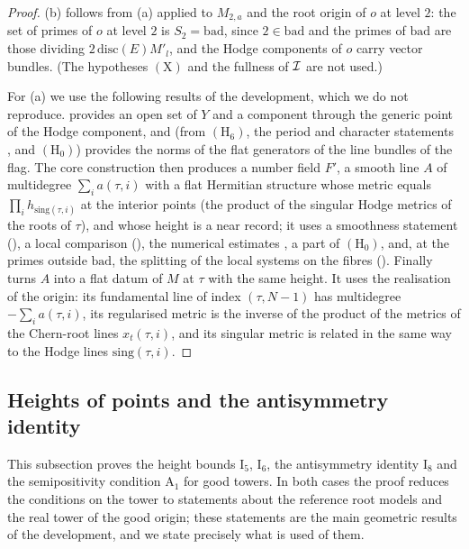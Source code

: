 \begin{proof}
(b) follows from (a) applied to $M_{2,a}$ and the root origin of $o$ at level $2$: the set of primes of $o$ at level
$2$ is $S_2=\mathrm{bad}$, since $2\in\mathrm{bad}$ and the primes of $\mathrm{bad}$ are those dividing
$2\,\mathrm{disc}(E)M'_l$, and the Hodge components of $o$ carry vector bundles. (The hypotheses $(\mathrm{X})$ and the
fullness of $\mathcal{I}$ are not used.)

For (a) we use the following results of the development, which we do not reproduce.
 provides an open set of $Y$ and a component through the generic point of the
Hodge component, and  (from $(\mathrm{H}_6)$, the period and character
statements ,  and $(\mathrm{H}_0)$)
provides the norms of the flat generators of the line bundles of the flag. The core construction
 then produces a number field $F'$, a smooth line $A$ of multidegree
$\sum_ia(\tau,i)$ with a flat Hermitian structure whose metric equals $\prod_ih_{\mathrm{sing}(\tau,i)}$ at the interior
points (the product of the singular Hodge metrics of the roots of $\tau$), and whose height is a near record; it uses a
smoothness statement (), a local comparison
(), the numerical estimates , a part
of $(\mathrm{H}_0)$, and, at the primes outside $\mathrm{bad}$, the splitting of the local systems on the fibres
(). Finally 
turns $A$ into a flat datum of $M$ at $\tau$ with the same height. It uses the realisation of the origin: its
fundamental line of index $(\tau,N-1)$ has multidegree $-\sum_ia(\tau,i)$, its regularised metric is the inverse of
the product of the metrics of the Chern-root lines $x_t(\tau,i)$, and its singular metric is related in the same way
to the Hodge lines $\mathrm{sing}(\tau,i)$.
\end{proof}

\subsection{Heights of points and the antisymmetry identity}\label{pf:volthm:sec:deep}

This subsection proves the height bounds $\mathrm{I}_5$, $\mathrm{I}_6$, the antisymmetry identity $\mathrm{I}_8$ and the
semipositivity condition $\mathrm{A}_1$ for good towers. In both cases the proof reduces the conditions on the tower to
statements about the reference root models and the real tower of the good origin; these statements are the main
geometric results of the development, and we state precisely what is used of them.

